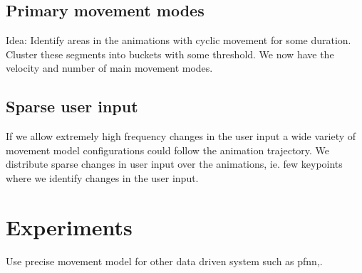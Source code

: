 \documentclass[format=acmtog]{acmart}
\begin{document}
\subsection{Primary movement modes}
Idea: Identify areas in the animations with cyclic movement for some duration. Cluster these segments into buckets with some threshold. We now have the velocity and number of main movement modes.
\subsection{Sparse user input}
If we allow extremely high frequency changes in the user input a wide variety of movement model configurations could follow the animation trajectory. We distribute sparse changes in user input over the animations, ie. few keypoints where we identify changes in the user input.

\section{Experiments}
Use precise movement model for other data driven system such as pfnn,. 

{}

\end{document}
